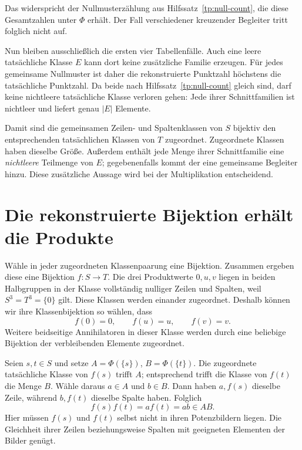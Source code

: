\documentclass[a4paper,11pt]{article}
\theoremstyle{remark}
\begin{document}
Das widerspricht der Nullmusterzählung aus Hilfssatz~\ref{tp:null-count}, die diese
Gesamtzahlen unter $\Phi$ erhält. Der Fall verschiedener kreuzender
Begleiter tritt folglich nicht auf.

Nun bleiben ausschließlich die ersten vier Tabellenfälle. Auch eine
leere tatsächliche Klasse $E$ kann dort keine zusätzliche Familie
erzeugen. Für jedes gemeinsame Nullmuster ist daher die rekonstruierte
Punktzahl höchstens die tatsächliche Punktzahl. Da beide nach
Hilfssatz~\ref{tp:null-count} gleich sind, darf keine nichtleere tatsächliche
Klasse verloren gehen: Jede ihrer Schnittfamilien ist nichtleer und
liefert genau $|E|$ Elemente.

Damit sind die gemeinsamen Zeilen- und Spaltenklassen von $S$ bijektiv
den entsprechenden tatsächlichen Klassen von $T$ zugeordnet. Zugeordnete
Klassen haben dieselbe Größe. Außerdem enthält jede Menge ihrer
Schnittfamilie eine \emph{nichtleere} Teilmenge von $E$; gegebenenfalls
kommt der eine gemeinsame Begleiter hinzu. Diese zusätzliche Aussage
wird bei der Multiplikation entscheidend.

\section{Die rekonstruierte Bijektion erhält die Produkte}

Wähle in jeder zugeordneten Klassenpaarung eine Bijektion. Zusammen
ergeben diese eine Bijektion $f:S\to T$. Die drei Produktwerte $0,u,v$
liegen in beiden Halbgruppen in der Klasse vollständig nulliger Zeilen
und Spalten, weil $S^3=T^3=\{0\}$ gilt. Diese Klassen werden einander
zugeordnet. Deshalb können wir ihre Klassenbijektion so wählen, dass
\[
 f(0)=0,\qquad f(u)=u,\qquad f(v)=v.
\]
Weitere beidseitige Annihilatoren in dieser Klasse werden durch eine
beliebige Bijektion der verbleibenden Elemente zugeordnet.

Seien $s,t\in S$ und setze $A=\Phi(\{s\})$, $B=\Phi(\{t\})$.
Die zugeordnete tatsächliche Klasse von $f(s)$ trifft $A$; entsprechend
trifft die Klasse von $f(t)$ die Menge $B$. Wähle daraus $a\in A$ und
$b\in B$. Dann haben $a,f(s)$ dieselbe Zeile, während $b,f(t)$ dieselbe
Spalte haben. Folglich
\begin{equation}
 f(s)f(t)=a f(t)=ab\in AB.
 \label{tp:membership}
\end{equation}
Hier müssen $f(s)$ und $f(t)$ selbst nicht in ihren Potenzbildern liegen.
Die Gleichheit ihrer Zeilen beziehungsweise Spalten mit geeigneten
Elementen der Bilder genügt.
\end{document}
